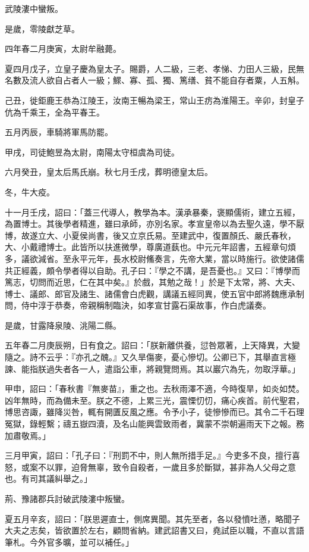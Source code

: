 \begin{pinyinscope}
武陵漊中蠻叛。

是歲，零陵獻芝草。

四年春二月庚寅，太尉牟融薨。

夏四月戊子，立皇子慶為皇太子。賜爵，人二級，三老、孝悌、力田人三級，民無名數及流人欲自占者人一級；鰥、寡、孤、獨、篤缮、貧不能自存者粟，人五斛。

己丑，徙鉅鹿王恭為江陵王，汝南王暢為梁王，常山王疠為淮陽王。辛卯，封皇子伉為千乘王，全為平春王。

五月丙辰，車騎將軍馬防罷。

甲戌，司徒鮑昱為太尉，南陽太守桓虞為司徒。

六月癸丑，皇太后馬氏崩。秋七月壬戌，葬明德皇太后。

冬，牛大疫。

十一月壬戌，詔曰：「蓋三代導人，教學為本。漢承暴秦，褒顯儒術，建立五經，為置博士。其後學者精進，雖曰承師，亦別名家。孝宣皇帝以為去聖久遠，學不厭博，故遂立大、小夏侯尚書，後又立京氏易。至建武中，復置顏氏、嚴氏春秋，大、小戴禮博士。此皆所以扶進微學，尊廣道蓺也。中元元年詔書，五經章句煩多，議欲減省。至永平元年，長水校尉鯈奏言，先帝大業，當以時施行。欲使諸儒共正經義，頗令學者得以自助。孔子曰：『學之不講，是吾憂也。』又曰：『博學而篤志，切問而近思，仁在其中矣。』於戲，其勉之哉！」於是下太常，將、大夫、博士、議郎、郎官及諸生、諸儒會白虎觀，講議五經同異，使五官中郎將魏應承制問，侍中淳于恭奏，帝親稱制臨決，如孝宣甘露石渠故事，作白虎議奏。

是歲，甘露降泉陵、洮陽二縣。

五年春二月庚辰朔，日有食之。詔曰：「朕新離供養，愆咎眾著，上天降異，大變隨之。詩不云乎：『亦孔之醜。』又久旱傷麥，憂心慘切。公卿已下，其舉直言極諫、能指朕過失者各一人，遣詣公車，將親覽問焉。其以巖穴為先，勿取浮華。」

甲申，詔曰：「春秋書『無麥苗』，重之也。去秋雨澤不適，今時復旱，如炎如焚。凶年無時，而為備未至。朕之不德，上累三光，震慄忉忉，痛心疾首。前代聖君，博思咨諏，雖降災咎，輒有開匱反風之應。令予小子，徒慘慘而已。其令二千石理冤獄，錄輕繫；禱五嶽四瀆，及名山能興雲致雨者，冀蒙不崇朝遍雨天下之報。務加肅敬焉。」

三月甲寅，詔曰：「孔子曰：『刑罰不中，則人無所措手足。』今吏多不良，擅行喜怒，或案不以罪，迫脅無辜，致令自殺者，一歲且多於斷獄，甚非為人父母之意也。有司其議糾舉之。」

荊、豫諸郡兵討破武陵漊中叛蠻。

夏五月辛亥，詔曰：「朕思遲直士，側席異聞。其先至者，各以發憤吐懣，略聞子大夫之志矣，皆欲置於左右，顧問省納。建武詔書又曰，堯試臣以職，不直以言語筆札。今外官多曠，並可以補任。」


\end{pinyinscope}
